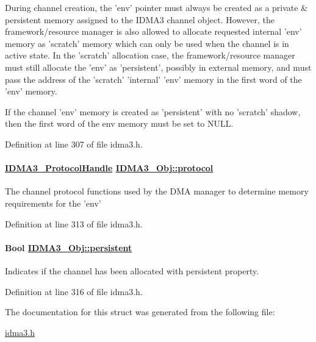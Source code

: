 During channel creation, the 'env' pointer must always be created as a private \& persistent memory assigned to the IDMA3 channel object. However, the framework/resource manager is also allowed to allocate requested internal 'env' memory as 'scratch' memory which can only be used when the channel is in active state. In the 'scratch' allocation case, the framework/resource manager must still allocate the 'env' as 'persistent', possibly in external memory, and must pass the address of the 'scratch' 'internal' 'env' memory in the first word of the 'env' memory.

If the channel 'env' memory is created as 'persistent' with no 'scratch' shadow, then the first word of the env memory must be set to NULL. 

Definition at line 307 of file idma3.h.\hypertarget{struct_i_d_m_a3___obj_74d1aa95d8583438686b86229a33a429}{
\paragraph[protocol]{\setlength{\rightskip}{0pt plus 5cm}\hyperlink{struct_i_d_m_a3___protocol_obj}{IDMA3\_\-Protocol\-Handle} \hyperlink{struct_i_d_m_a3___obj_74d1aa95d8583438686b86229a33a429}{IDMA3\_\-Obj::protocol}}\hfill}
\label{struct_i_d_m_a3___obj_74d1aa95d8583438686b86229a33a429}


The channel protocol functions used by the DMA manager to determine memory requirements for the 'env' 

Definition at line 313 of file idma3.h.\hypertarget{struct_i_d_m_a3___obj_a45d155055413e89a97d98744809ee12}{
\paragraph[persistent]{\setlength{\rightskip}{0pt plus 5cm}Bool \hyperlink{struct_i_d_m_a3___obj_a45d155055413e89a97d98744809ee12}{IDMA3\_\-Obj::persistent}}\hfill}
\label{struct_i_d_m_a3___obj_a45d155055413e89a97d98744809ee12}


Indicates if the channel has been allocated with persistent property. 

Definition at line 316 of file idma3.h.

The documentation for this struct was generated from the following file:\begin{CompactItemize}
\item 
\hyperlink{idma3_8h}{idma3.h}\end{CompactItemize}

